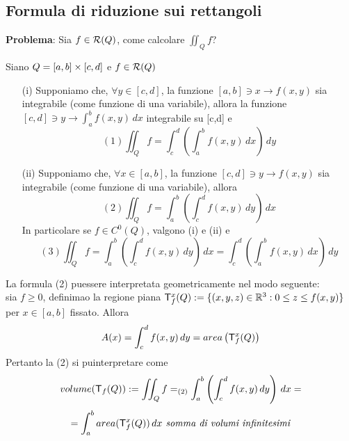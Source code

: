 \subsection{Formula di riduzione sui rettangoli}
\textbf{Problema}: Sia $f \in \mathcal{R}(Q)$, come calcolare $\iint_{Q}f$?
\begin{theorem}
  Siano $Q = [a,b]\times[c,d]$ e $f \in \mathcal{R}(Q)$
  \begin{itemize}
    \item[(i)] Supponiamo che, $\forall y \in [c,d]$, la funzione 
                $[a,b]\ni x \to f(x,y)$ sia integrabile (come funzione di una variabile), 
                allora la funzione 
                $[c,d]\ni y \to \int_{a}^{b} f(x,y) \, dx$ \ace integrabile su [c,d] e 
                $$(1) \iint_{Q} f = \int_{c}^{d} \left(\int_{a}^{b} f(x,y) \, dx\right) \, dy$$
    \item[(ii)] Supponiamo che, $\forall x \in [a,b]$, la funzione 
                $[c,d]\ni y \to f(x,y)$ sia integrabile (come funzione di una variabile), 
                allora 
                $$(2) \iint_{Q} f = \int_{a}^{b} \left(\int_{c}^{d} f(x,y) \, dy\right) \, dx$$
                In particolare se $f\in C^0(Q)$, valgono (i) e (ii) e 
                $$(3) \iint_{Q} f = \int_{a}^{b} \left(\int_{c}^{d} f(x,y) \, dy\right) \, dx = \int_{c}^{d} \left(\int_{a}^{b} f(x,y) \, dx\right) \, dy$$
  \end{itemize}
\end{theorem}
\begin{osservazione}
  La formula (2) pu\aco essere interpretata geometricamente nel modo seguente: \\
  sia $f \geq 0$, definimao la regione piana $\mathsf{T}_{f}^{x}(Q):=\{(x,y,z)\in \mathbb{R}^3 : 0 \leq z \leq f(x,y)\}$ per 
  $x\in[a,b]$ fissato. Allora $$A(x) = \int_{c}^{d} f(x,y) \, dy = area\left(\mathsf{T}_{f}^{x}(Q)\right)$$
  Pertanto la (2) si pu\aco interpretare come 
  $$volume(\mathsf{T}_{f}(Q)):= \iint_{Q}f =_{(2)} \int_{a}^{b} \left(\int_{c}^{d} f(x,y) \, dy\right) \, dx = $$
  $$= \int_{a}^{b} area(\mathsf{T}_{f}^{x}(Q)) \, dx \textit{ somma di volumi infinitesimi}$$
\end{osservazione}
